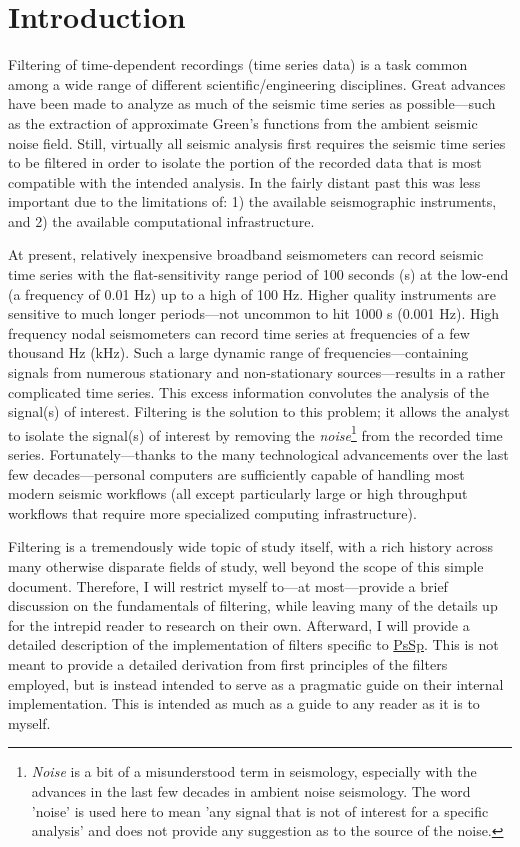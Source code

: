 \documentclass[american, twoside]{article}
\begin{document}
\section{Introduction} \label{Introduction}
Filtering of time-dependent recordings (time series data) is a task common among a wide range of different scientific/engineering disciplines.
Great advances have been made to analyze as much of the seismic time series as possible---such as the extraction of approximate
Green's functions from the ambient seismic noise field. Still, virtually all seismic analysis first requires the seismic time series to
be filtered in order to isolate the portion of the recorded data that is most compatible with the intended analysis. In the fairly
distant past this was less important due to the limitations of: 1) the available seismographic instruments, and 2) the available
computational infrastructure.

At present, relatively inexpensive broadband seismometers can record seismic time series with the flat-sensitivity
range period of 100 seconds (s) at the low-end (a frequency of 0.01 Hz) up to a high of 100 Hz. Higher quality instruments are sensitive to
much longer periods---not uncommon to hit 1000 s (0.001 Hz). High frequency nodal seismometers can record time series at frequencies of a few
thousand Hz (kHz). Such a large dynamic range of frequencies---containing signals from numerous stationary and non-stationary sources---results in a
rather complicated time series. This excess information convolutes the analysis of the signal(s) of interest.
Filtering is the solution to this problem; it allows the analyst to isolate the signal(s) of interest by removing the \textit{noise}\footnote{\textit{Noise} is a bit of a misunderstood term in
seismology, especially with the advances in the last few decades in ambient noise seismology. The word 'noise' is used here to mean 'any
signal that is not of interest for a specific analysis' and does not provide any suggestion as to the source of the noise.} from the
recorded time series. Fortunately---thanks to the many technological advancements over the last few decades---personal computers are sufficiently
capable of handling most modern seismic workflows (all except particularly large or high throughput workflows that require more specialized
computing infrastructure).

Filtering is a tremendously wide topic of study itself, with a rich history across many otherwise disparate fields of study, well
beyond the scope of this simple document. Therefore, I will restrict myself to---at most---provide a brief discussion
on the fundamentals of filtering, while leaving many of the details up for the intrepid reader to research on their own. Afterward,
I will provide a detailed description of the implementation of filters specific to \href{https://github.com/arbCoding/PsSp}{PsSp}.
This is not meant to provide a detailed derivation from first principles of the filters employed, but is instead intended to serve as
a pragmatic guide on their internal implementation. This is intended as much as a guide to any reader as it is to myself.
\end{document}
